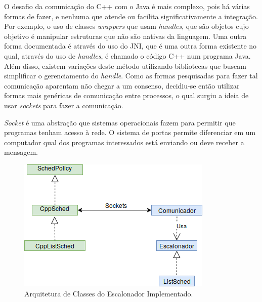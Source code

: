 O desafio da comunicação do C++ com o Java é mais complexo, pois há várias formas de fazer, e nenhuma que atende ou facilita significativamente a integração. Por exemplo, o uso de classes \textit{wrappers} que usam \textit{handles}, que são objetos cujo objetivo é manipular estruturas que não são nativas da linguagem\cite{CppJavaHandle}. Uma outra forma documentada é através do uso do \acrfull{JNI}, que é uma outra forma existente no qual, através do uso de \textit{handles}, é chamado o código C++ num programa Java\cite{CppJavaJNI}. Além disso, existem variações deste método utilizando bibliotecas que buscam simplificar o gerenciamento do \textit{handle}. Como as formas pesquisadas para fazer tal comunicação aparentam não chegar a um consenso, decidiu-se então utilizar formas mais genéricas de comunicação entre processos, o qual surgiu a ideia de usar \textit{sockets} para fazer a comunicação.

\textit{Socket} é uma abstração que sistemas operacionais fazem para permitir que programas tenham acesso à rede. O sistema de portas permite diferenciar em um computador qual dos programas interessados está enviando ou deve receber a mensagem. %

\begin{figure}[htbp]
	\centerline{\includegraphics[scale=0.7]{img/Proposta.png}}
	\caption{Arquitetura de Classes do Escalonador Implementado.}
	\label{ArquiteturaProposta}
\end{figure}

